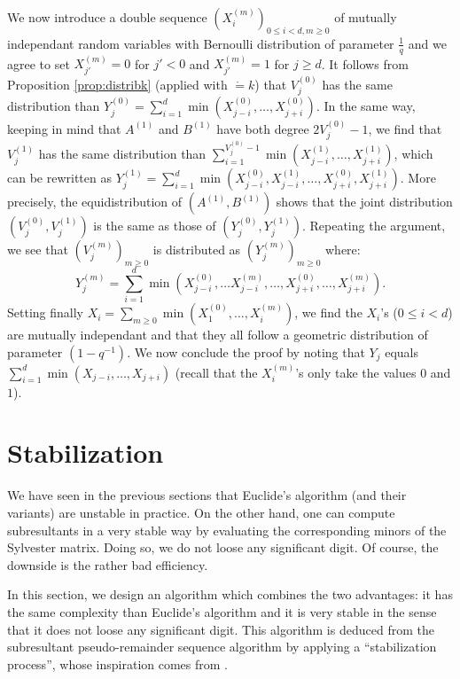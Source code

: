 \documentclass{article}
\begin{document}
We now introduce a double sequence $(X_i^{(m)})_{0 \leq i < d, m 
\geq 0}$ of mutually independant random variables with Bernoulli
distribution of parameter $\frac 1 q$ and we agree to set 
$X_{j'}^{(m)} = 0$ for $j' < 0$ and $X_{j'}^{(m)} = 1$ for $j \geq d$.
It follows from Proposition \ref{prop:distribk} (applied with $\ring = 
k$) that $V_j^{(0)}$ has the same distribution than 
$Y_j^{(0)} = \sum_{i=1}^d \min(X_{j-i}^{(0)}, \ldots, X_{j+i}^{(0)})$.
In the same way, keeping in mind that $A^{(1)}$ and $B^{(1)}$ have both 
degree $2V_j^{(0)} - 1$, we find that $V_j^{(1)}$ has the same 
distribution than $\sum_{i=1}^{V_j^{(0)} - 1} \min(X_{j-i}^{(1)}, 
\ldots, X_{j+i}^{(1)})$, which can be rewritten as
$Y_j^{(1)} = \sum_{i=1}^d \min(X_{j-i}^{(0)}, X_{j-i}^{(1)}, \ldots, 
X_{j+i}^{(0)}, X_{j+i}^{(1)})$. More precisely,
the equidistribution of $(A^{(1)}, B^{(1)})$ shows that the 
joint distribution $(V_j^{(0)}, V_j^{(1)})$ is the same as those
of $(Y_j^{(0)}, Y_j^{(1)})$. Repeating the argument, we see that
$(V_j^{(m)})_{m \geq 0}$ is distributed as $(Y_j^{(m)})_{m \geq 0}$
where:
$$Y_j^{(m)} = \sum_{i=1}^d \min(X_{j-i}^{(0)}, \ldots X_{j-i}^{(m)}, 
\ldots, X_{j+i}^{(0)}, \ldots, X_{j+i}^{(m)}).$$
Setting finally $X_i = \sum_{m \geq 0} \min(X_1^{(0)}, \ldots, 
X_i^{(m)})$, we find the $X_i$'s ($0 \leq i < d$) are mutually 
independant and that they all follow a geometric distribution of 
parameter $(1 - q^{-1})$. We now conclude the proof by noting that 
$Y_j$ equals $\sum_{i=1}^d \min(X_{j-i}, \ldots, X_{j+i})$ (recall
that the $X_i^{(m)}$'s only take the values $0$ and $1$).

\section{Stabilization}
\label{sec:stable}

We have seen in the previous sections that Euclide's algorithm (and 
their variants) are unstable in practice. On the other hand, 
one can compute subresultants in a very stable way by evaluating
the corresponding minors of the Sylvester matrix. Doing so, we do
not loose any significant digit. Of course, the downside is the
rather bad efficiency.

In this section, we design an algorithm which combines the two
advantages: it has the same complexity than Euclide's algorithm
and it is very stable in the sense that it does not loose any
significant digit. 
This algorithm is deduced from the subresultant pseudo-remainder
sequence algorithm by applying a ``stabilization process'', whose 
inspiration comes from \cite{padicprec}.
\end{document}

